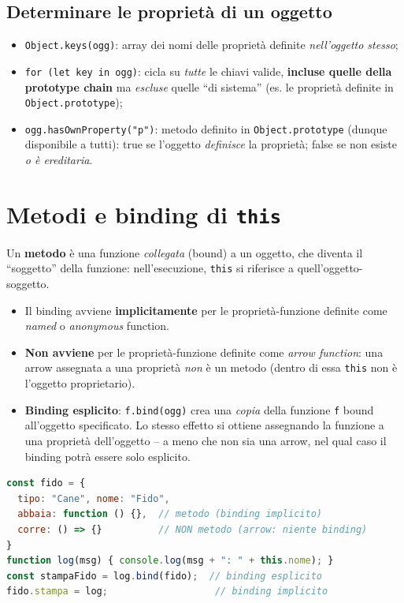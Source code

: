 \subsection{Determinare le propriet\`a di un oggetto}
\begin{itemize}
  \item \texttt{Object.keys(ogg)}: array dei nomi delle propriet\`a definite
        \emph{nell'oggetto stesso};
  \item \texttt{for (let key in ogg)}: cicla su \emph{tutte} le chiavi valide, \textbf{incluse
        quelle della prototype chain} ma \emph{escluse} quelle ``di sistema'' (es. le
        propriet\`a definite in \texttt{Object.prototype});
  \item \texttt{ogg.hasOwnProperty("p")}: metodo definito in \texttt{Object.prototype} (dunque
        disponibile a tutti): true se l'oggetto \emph{definisce} la propriet\`a; false se non
        esiste \emph{o \`e ereditaria}.
\end{itemize}

\section{Metodi e binding di \texttt{this}}

\begin{definizione}[Metodo]
Un \textbf{metodo} \`e una funzione \emph{collegata} (bound) a un oggetto, che diventa il
``soggetto'' della funzione: nell'esecuzione, \texttt{this} si riferisce a
quell'oggetto-soggetto.
\end{definizione}

\begin{importante}
\begin{itemize}
  \item Il binding avviene \textbf{implicitamente} per le propriet\`a-funzione definite come
        \emph{named} o \emph{anonymous} function.
  \item \textbf{Non avviene} per le propriet\`a-funzione definite come \emph{arrow function}:
        una arrow assegnata a una propriet\`a \emph{non} \`e un metodo (dentro di essa
        \texttt{this} non \`e l'oggetto proprietario).
  \item \textbf{Binding esplicito}: \texttt{f.bind(ogg)} crea una \emph{copia} della funzione
        \texttt{f} bound all'oggetto specificato. Lo stesso effetto si ottiene assegnando la
        funzione a una propriet\`a dell'oggetto -- a meno che non sia una arrow, nel qual caso
        il binding potr\`a essere solo esplicito.
\end{itemize}
\begin{lstlisting}[language=JavaScript]
const fido = {
  tipo: "Cane", nome: "Fido",
  abbaia: function () {},  // metodo (binding implicito)
  corre: () => {}          // NON metodo (arrow: niente binding)
}
function log(msg) { console.log(msg + ": " + this.nome); }
const stampaFido = log.bind(fido);  // binding esplicito
fido.stampa = log;                   // binding implicito
\end{lstlisting}
\end{importante}

